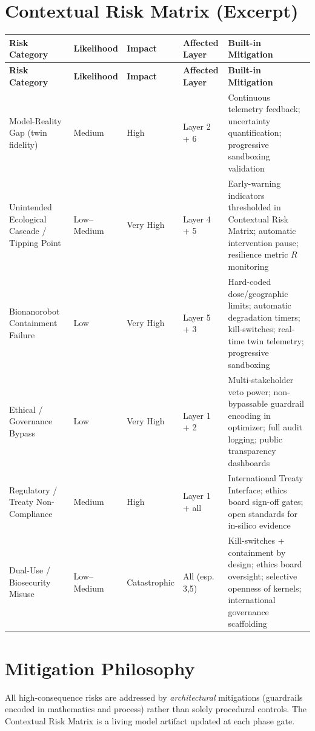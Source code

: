 \documentclass[11pt,a4paper]{report}
\begin{document}
\section{Contextual Risk Matrix (Excerpt)}

\begin{longtable}{>{\raggedright\arraybackslash}p{2.8cm} p{2cm} p{2cm} p{3cm} p{4cm}}
\toprule
\textbf{Risk Category} & \textbf{Likelihood} & \textbf{Impact} & \textbf{Affected Layer} & \textbf{Built-in Mitigation} \\
\midrule
\endfirsthead
\toprule
\textbf{Risk Category} & \textbf{Likelihood} & \textbf{Impact} & \textbf{Affected Layer} & \textbf{Built-in Mitigation} \\
\midrule
\endhead
\bottomrule
\endfoot
Model-Reality Gap (twin fidelity) & Medium & High & Layer 2 + 6 & Continuous telemetry feedback; uncertainty quantification; progressive sandboxing validation \\
Unintended Ecological Cascade / Tipping Point & Low--Medium & Very High & Layer 4 + 5 & Early-warning indicators thresholded in Contextual Risk Matrix; automatic intervention pause; resilience metric $R$ monitoring \\
Bionanorobot Containment Failure & Low & Very High & Layer 5 + 3 & Hard-coded dose/geographic limits; automatic degradation timers; kill-switches; real-time twin telemetry; progressive sandboxing \\
Ethical / Governance Bypass & Low & Very High & Layer 1 + 2 & Multi-stakeholder veto power; non-bypassable guardrail encoding in optimizer; full audit logging; public transparency dashboards \\
Regulatory / Treaty Non-Compliance & Medium & High & Layer 1 + all & International Treaty Interface; ethics board sign-off gates; open standards for in-silico evidence \\
Dual-Use / Biosecurity Misuse & Low--Medium & Catastrophic & All (esp. 3,5) & Kill-switches + containment by design; ethics board oversight; selective openness of kernels; international governance scaffolding \\
\bottomrule
\end{longtable}

\section{Mitigation Philosophy}

All high-consequence risks are addressed by \textit{architectural} mitigations (guardrails encoded in mathematics and process) rather than solely procedural controls. The Contextual Risk Matrix is a living model artifact updated at each phase gate.
\end{document}
